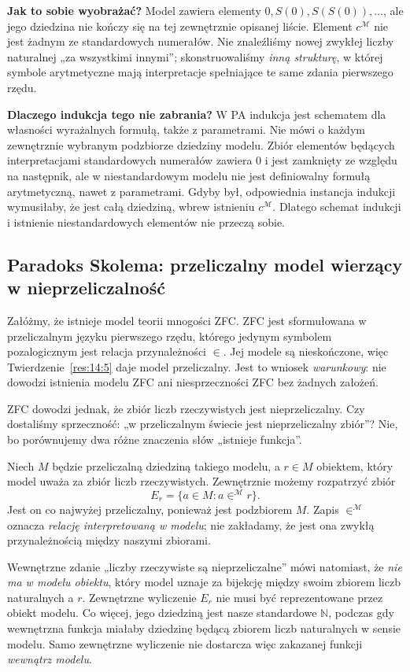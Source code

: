 \documentclass[11pt,a4paper]{article}
\numberwithin{equation}{section}
\theoremstyle{plain}
\theoremstyle{definition}
\theoremstyle{remark}
\begin{document}
\textbf{Jak to sobie wyobrażać?} Model zawiera elementy $0,S(0),S(S(0)),\ldots$, ale jego dziedzina nie kończy się na tej zewnętrznie opisanej liście. Element $c^{\mathcal M}$ nie jest żadnym ze standardowych numerałów. Nie znaleźliśmy nowej zwykłej liczby naturalnej „za wszystkimi innymi”; skonstruowaliśmy \emph{inną strukturę}, w której symbole arytmetyczne mają interpretacje spełniające te same zdania pierwszego rzędu.

\textbf{Dlaczego indukcja tego nie zabrania?} W PA indukcja jest schematem dla własności wyrażalnych formułą, także z parametrami. Nie mówi o każdym zewnętrznie wybranym podzbiorze dziedziny modelu. Zbiór elementów będących interpretacjami standardowych numerałów zawiera $0$ i jest zamknięty ze względu na następnik, ale w niestandardowym modelu nie jest definiowalny formułą arytmetyczną, nawet z parametrami. Gdyby był, odpowiednia instancja indukcji wymusiłaby, że jest całą dziedziną, wbrew istnieniu $c^{\mathcal M}$. Dlatego schemat indukcji i istnienie niestandardowych elementów nie przeczą sobie.

\subsection*{Paradoks Skolema: przeliczalny model wierzący w nieprzeliczalność}\label{sec:15:3}
Załóżmy, że istnieje model teorii mnogości ZFC. ZFC jest sformułowana w przeliczalnym języku pierwszego rzędu, którego jedynym symbolem pozalogicznym jest relacja przynależności $\in$. Jej modele są nieskończone, więc Twierdzenie~\ref{res:14:5} daje model przeliczalny. Jest to wniosek \emph{warunkowy}: nie dowodzi istnienia modelu ZFC ani niesprzeczności ZFC bez żadnych założeń.

ZFC dowodzi jednak, że zbiór liczb rzeczywistych jest nieprzeliczalny. Czy dostaliśmy sprzeczność: „w przeliczalnym świecie jest nieprzeliczalny zbiór”? Nie, bo porównujemy dwa różne znaczenia słów „istnieje funkcja”.

Niech $M$ będzie przeliczalną dziedziną takiego modelu, a $r\in M$ obiektem, który model uważa za zbiór liczb rzeczywistych. Zewnętrznie możemy rozpatrzyć zbiór
\[
E_r=\{a\in M:a\mathrel{\in^{\mathcal M}}r\}.
\]
Jest on co najwyżej przeliczalny, ponieważ jest podzbiorem $M$. Zapis $\in^{\mathcal M}$ oznacza \emph{relację interpretowaną w modelu}; nie zakładamy, że jest ona zwykłą przynależnością między naszymi zbiorami.

Wewnętrzne zdanie „liczby rzeczywiste są nieprzeliczalne” mówi natomiast, że \emph{nie ma w modelu obiektu}, który model uznaje za bijekcję między swoim zbiorem liczb naturalnych a $r$. Zewnętrzne wyliczenie $E_r$ nie musi być reprezentowane przez obiekt modelu. Co więcej, jego dziedziną jest nasze standardowe $\mathbb N$, podczas gdy wewnętrzna funkcja miałaby dziedzinę będącą zbiorem liczb naturalnych w sensie modelu. Samo zewnętrzne wyliczenie nie dostarcza więc zakazanej funkcji \emph{wewnątrz modelu}.
\end{document}
